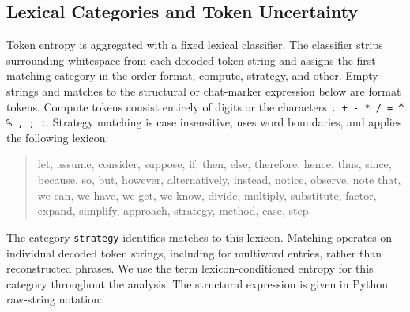 \documentclass[]{jingdong}
\theoremstyle{plain}
\theoremstyle{definition}
\theoremstyle{remark}
\begin{document}
\subsection{Lexical Categories and Token Uncertainty}
\label{app:role-definitions}

Token entropy is aggregated with a fixed lexical classifier. The classifier strips surrounding whitespace from each decoded token string and assigns the first matching category in the order format, compute, strategy, and other. Empty strings and matches to the structural or chat-marker expression below are format tokens. Compute tokens consist entirely of digits or the characters \texttt{. + - * / = \string^ \% , ; :}. Strategy matching is case insensitive, uses word boundaries, and applies the following lexicon:
\begin{quote}
\small
let, assume, consider, suppose, if, then, else, therefore, hence, thus, since, because, so, but, however, alternatively, instead, notice, observe, note that, we can, we have, we get, we know, divide, multiply, substitute, factor, expand, simplify, approach, strategy, method, case, step.
\end{quote}
The category \texttt{strategy} identifies matches to this lexicon. Matching operates on individual decoded token strings, including for multiword entries, rather than reconstructed phrases. We use the term lexicon-conditioned entropy for this category throughout the analysis. The structural expression is given in Python raw-string notation:
\end{document}
